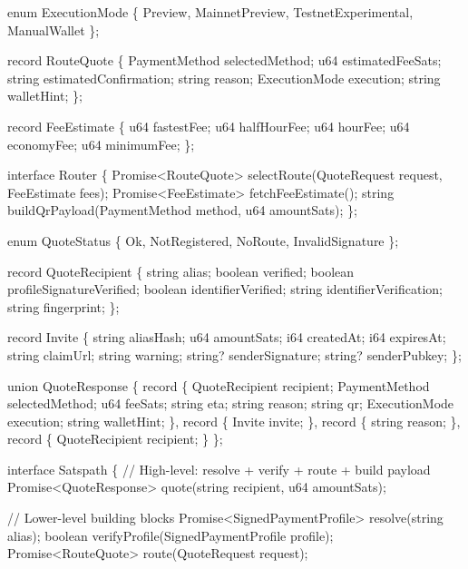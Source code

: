 \documentclass[
]{article}
\newenvironment{Shaded}{}{}
\newcommand{\NormalTok}[1]{#1}
\begin{document}
\begin{Shaded}
\begin{Highlighting}[]
\NormalTok{enum ExecutionMode \{ Preview, MainnetPreview, TestnetExperimental, ManualWallet \};}

\NormalTok{record RouteQuote \{}
\NormalTok{    PaymentMethod selectedMethod;}
\NormalTok{    u64 estimatedFeeSats;}
\NormalTok{    string estimatedConfirmation;}
\NormalTok{    string reason;}
\NormalTok{    ExecutionMode execution;}
\NormalTok{    string walletHint;}
\NormalTok{\};}

\NormalTok{record FeeEstimate \{}
\NormalTok{    u64 fastestFee;}
\NormalTok{    u64 halfHourFee;}
\NormalTok{    u64 hourFee;}
\NormalTok{    u64 economyFee;}
\NormalTok{    u64 minimumFee;}
\NormalTok{\};}

\NormalTok{interface Router \{}
\NormalTok{    Promise\textless{}RouteQuote\textgreater{} selectRoute(QuoteRequest request, FeeEstimate fees);}
\NormalTok{    Promise\textless{}FeeEstimate\textgreater{} fetchFeeEstimate();}
\NormalTok{    string buildQrPayload(PaymentMethod method, u64 amountSats);}
\NormalTok{\};}

\NormalTok{enum QuoteStatus \{ Ok, NotRegistered, NoRoute, InvalidSignature \};}

\NormalTok{record QuoteRecipient \{}
\NormalTok{    string alias;}
\NormalTok{    boolean verified;}
\NormalTok{    boolean profileSignatureVerified;}
\NormalTok{    boolean identifierVerified;}
\NormalTok{    string identifierVerification;}
\NormalTok{    string fingerprint;}
\NormalTok{\};}

\NormalTok{record Invite \{}
\NormalTok{    string aliasHash;}
\NormalTok{    u64 amountSats;}
\NormalTok{    i64 createdAt;}
\NormalTok{    i64 expiresAt;}
\NormalTok{    string claimUrl;}
\NormalTok{    string warning;}
\NormalTok{    string? senderSignature;}
\NormalTok{    string? senderPubkey;}
\NormalTok{\};}

\NormalTok{union QuoteResponse \{}
\NormalTok{    record \{ QuoteRecipient recipient; PaymentMethod selectedMethod; u64 feeSats; string eta; string reason; string qr; ExecutionMode execution; string walletHint; \},}
\NormalTok{    record \{ Invite invite; \},}
\NormalTok{    record \{ string reason; \},}
\NormalTok{    record \{ QuoteRecipient recipient; \}}
\NormalTok{\};}

\NormalTok{interface Satspath \{}
\NormalTok{    // High{-}level: resolve + verify + route + build payload}
\NormalTok{    Promise\textless{}QuoteResponse\textgreater{} quote(string recipient, u64 amountSats);}

\NormalTok{    // Lower{-}level building blocks}
\NormalTok{    Promise\textless{}SignedPaymentProfile\textgreater{} resolve(string alias);}
\NormalTok{    boolean verifyProfile(SignedPaymentProfile profile);}
\NormalTok{    Promise\textless{}RouteQuote\textgreater{} route(QuoteRequest request);}


\end{Highlighting}
\end{Shaded}
\end{document}
